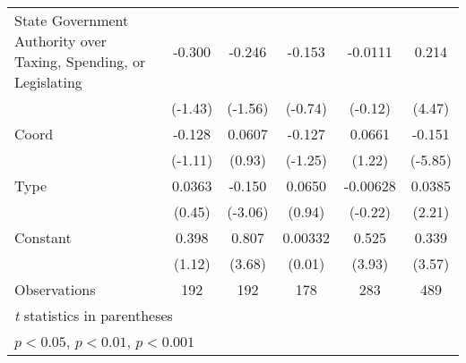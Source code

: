 {\begin{tabular*}{\linewidth}{@{\hskip\tabcolsep\extracolsep\fill}l*{5}{c}}
\addlinespace
State Government Authority over Taxing, Spending, or Legislating&   -0.300         &   -0.246         &   -0.153         &  -0.0111         &    0.214\sym{***}\\
                &  (-1.43)         &  (-1.56)         &  (-0.74)         &  (-0.12)         &   (4.47)         \\
\addlinespace
Coord           &   -0.128         &   0.0607         &   -0.127         &   0.0661         &   -0.151\sym{***}\\
                &  (-1.11)         &   (0.93)         &  (-1.25)         &   (1.22)         &  (-5.85)         \\
\addlinespace
Type            &   0.0363         &   -0.150\sym{**} &   0.0650         & -0.00628         &   0.0385\sym{*}  \\
                &   (0.45)         &  (-3.06)         &   (0.94)         &  (-0.22)         &   (2.21)         \\
\addlinespace
Constant        &    0.398         &    0.807\sym{***}&  0.00332         &    0.525\sym{***}&    0.339\sym{***}\\
                &   (1.12)         &   (3.68)         &   (0.01)         &   (3.93)         &   (3.57)         \\
\midrule
Observations    &      192         &      192         &      178         &      283         &      489         \\
\bottomrule
\multicolumn{6}{l}{\footnotesize \textit{t} statistics in parentheses}\\
\multicolumn{6}{l}{\footnotesize \sym{*} \(p<0.05\), \sym{**} \(p<0.01\), \sym{***} \(p<0.001\)}\\
\end{tabular*}
}
